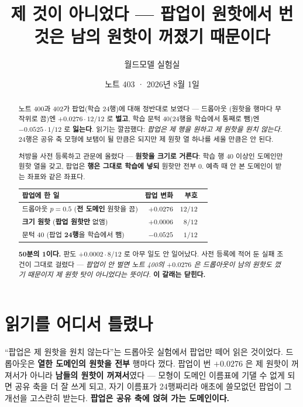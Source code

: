 \documentclass[11pt]{article}
\begin{document}
\title{제 것이 아니었다 --- 팝업이 원핫에서 번 것은 남의 원핫이 꺼졌기 때문이다}
\author{월드모델 실험실}
\date{노트 403 · 2026년 8월 1일}
\maketitle

\begin{abstract}
노트 400과 402가 팝업(학습 24행)에 대해 정반대로 보였다 --- 드롭아웃
(원핫을 행마다 무작위로 끔)엔 $+0.0276 \cdot 12/12$ 로 \textbf{벌고},
학습 문턱 40(24행을 학습에서 통째로 뺌)엔 $-0.0525 \cdot 1/12$ 로
\textbf{잃는다}. 읽기는 깔끔했다: \emph{팝업은 제 행을 원하고 제 원핫을
원치 않는다.} 24행은 공유 축 모형에 보탬이 될 만큼은 되지만 제 원핫 열
하나를 세울 만큼은 안 된다.

처방을 사전 등록하고 관문에 올렸다 --- \textbf{원핫을 크기로 거른다}:
학습 행 40 이상인 도메인만 원핫 열을 갖고, 팝업은 \textbf{행은 그대로
학습에 넣되} 원핫만 전부 0. 예측 때 안 본 도메인이 받는 좌표와 같은 좌표다.

\begin{center}
\begin{tabular}{lrrr}
\hline
팝업에 한 일 & 팝업 변화 & 부호 \\
\hline
드롭아웃 $p{=}0.5$ (\textbf{전 도메인} 원핫을 끔) & $+0.0276$ & $12/12$ \\
\textbf{크기 원핫} (\textbf{팝업 원핫만} 없앰) & $\mathbf{+0.0006}$ & $8/12$ \\
문턱 40 (팝업 \textbf{24행}을 학습에서 뺌) & $-0.0525$ & $1/12$ \\
\hline
\end{tabular}
\end{center}

\textbf{50분의 1이다.} 판도 $+0.0002 \cdot 8/12$ 로 아무 일도 안 일어났다.
사전 등록에 적어 둔 실패 조건이 그대로 걸렸다 --- \emph{팝업이 안 벌면
노트 400의 $+0.0276$ 은 드롭아웃이 남의 원핫도 껐기 때문이지 제 원핫 탓이
아니었다는 뜻이다.} \textbf{이 갈래는 닫힌다.}
\end{abstract}

\section{읽기를 어디서 틀렸나}

``팝업은 제 원핫을 원치 않는다''는 드롭아웃 실험에서 팝업만 떼어 읽은
것이었다. 드롭아웃은 \textbf{열한 도메인의 원핫을 전부} 행마다 껐다.
팝업이 번 $+0.0276$ 은 제 원핫이 꺼져서가 아니라 \textbf{남들의 원핫이
꺼져서}였다 --- 모형이 도메인 이름표에 기댈 수 없게 되면 공유 축을 더 잘
쓰게 되고, 자기 이름표가 24행짜리라 애초에 쓸모없던 팝업이 그 개선을
고스란히 받는다. \textbf{팝업은 공유 축에 얹혀 가는 도메인이다.}
\end{document}
